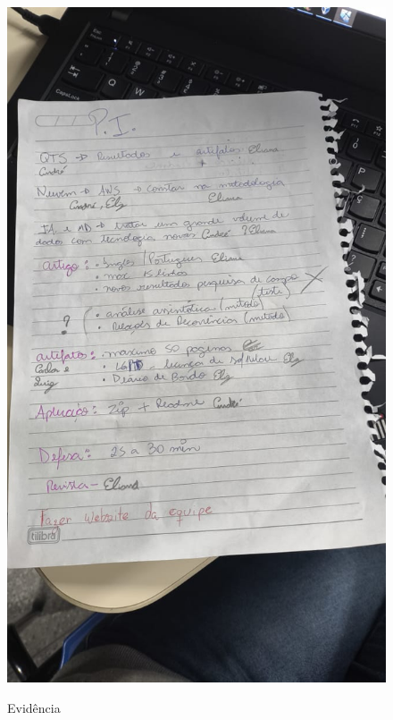 \documentclass[
landscape,
  a4paper,%
  12pt,%
  english,%
  brazilian,%
]{article}
\begin{document}


\begin{figure}[h]
\caption{Evidência}
    \centering
    \begin{minipage}[t]{0.30\textwidth}
        \centering
        \includegraphics[width=\textwidth]{evidencias/img1.jpeg}
        \label{fig:exemplo1}
    \end{minipage}
\end{figure}
\end{document}
